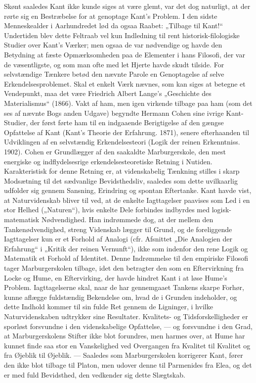 \documentclass[12pt,a4paper,openany]{book}
\newcommand{\opage}[1]{\marginnote{\footnotesize\textit{[#1]}}}
\begin{document}
Skønt saaledes Kant ikke kunde siges at være glemt, var det dog
naturligt, at der rørte sig en Bestræbelse for at genoptage Kant’s
Problem. I den sidste Menneskealder i Aarhundredet lød da ogsaa
Raabet: „Tilbage til Kant!“ Undertiden blev dette Feltraab vel kun
Indledning til rent historisk-filologiske Studier over Kant’s Værker;
men ogsaa de var nødvendige og havde den Betydning at fæste Opmærksomheden
paa de Elementer i hans Filosofi, der var de væsentligste,
og som man ofte med let Hjerte havde skudt tilside. For selvstændige
Tænkere betød den nævnte Parole en Genoptagelse af selve
Erkendelsesproblemet. Skal et enkelt Værk nævnes, som kan siges
at betegne et Vendepunkt, maa det være Friedrich Albert Lange’s
„Geschichte des Materialismus“ (1866). Vakt af ham, men igen virkende
tilbage paa ham (som det ses af nævnte Bogs anden Udgave)
begyndte Hermann Cohen sine ivrige Kant-Studier, der først førte
ham til en indgaaende Berigtigelse af den gængse Opfattelse af Kant
(Kant’s Theorie der Erfahrung. 1871), senere efterhaanden til Udviklingen
af en selvstændig Erkendelsesteori (Logik der reinen Erkenntniss.
1902). Cohen er Grundlægger af den saakaldte Marburgerskole,
den mest energiske og indflydelsesrige erkendelsesteoretiske
Retning i Nutiden. Karakteristisk for denne Retning er, at videnskabelig
Tænkning stilles i skarp Modsætning til det sædvanlige Bevidsthedsliv,
saaledes som dette uvilkaarlig udfolder sig gennem
Sansning, Erindring og spontan Eftertanke. Kant havde vist, at Naturvidenskab
bliver til ved, at de enkelte Iagttagelser paavises som
Led i en stor Helhed („Naturen“), hvis enkelte Dele forbindes indbyrdes
med logisk-matematisk Nødvendighed. Han indrømmede
dog, at der mellem den Tankenødvendighed, streng Videnskab lægger
til Grund, og de foreliggende Iagttagelser kun er et Forhold af
Analogi (cfr. Afsnittet „Die Analogien der Erfahrung“ i „Kritik der
reinen Vernunft“), ikke som indenfor den rene Logik og Matematik
et Forhold af Identitet. Denne Indrømmelse til den empiriske Filosofi
tager Marburgerskolen tilbage, idet den betragter den som en
Eftervirkning fra Locke og Hume, en Eftervirking, der havde hindret
Kant i at løse Hume’s Problem. Iagttagelserne skal, naar de har
gennemgaaet Tankens skarpe Forhør, kunne aflægge fuldstændig
Bekendelse om, hvad de i Grunden indeholder, og dette Indhold
\opage{80}kommer til sin fulde Ret gennem de Ligninger, i hvilke Naturvidenskaben
udtrykker sine Resultater. Kvalitets- og Tidsforskelligheder
er sporløst forsvundne i den videnskabelige Opfattelse, --- og
forsvundne i den Grad, at Marburgerskolens Stifter ikke blot forundres,
men harmes over, at Hume har kunnet finde saa stor en Vanskelighed
ved Overgangen fra Kvalitet til Kvalitet og fra Øjeblik til Øjeblik.
--- Saaledes som Marburgerskolen korrigerer Kant, fører den
ikke blot tilbage til Platon, men udover denne til Parmenides fra
Elea, og det er med fuld Bevidsthed, den vedkender sig dette Slægtskab.
\end{document}
